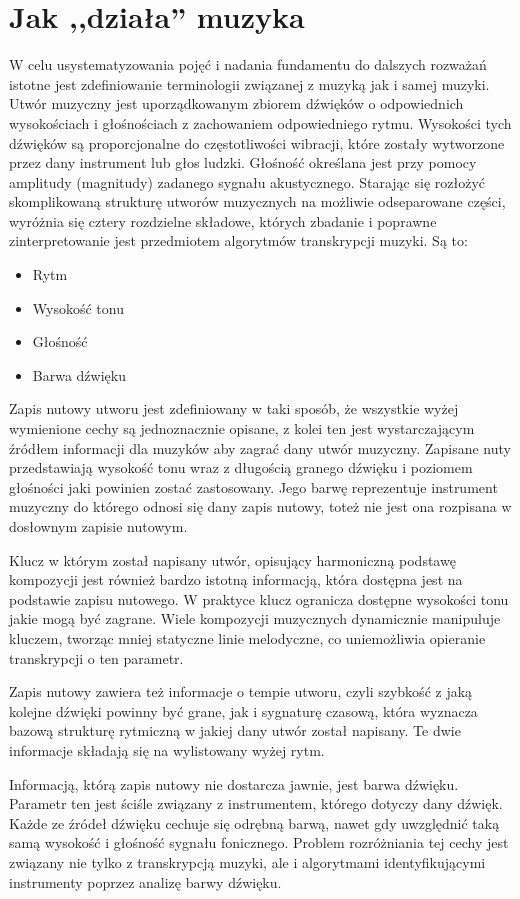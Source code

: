 \documentclass[12pt,a4paper,twoside]{mwart}
\begin{document}
\section{Jak ,,działa'' muzyka}\label{sec:JakDzialaMuzyka}
W celu usystematyzowania pojęć i nadania fundamentu do dalszych rozważań istotne jest zdefiniowanie terminologii związanej z muzyką jak i samej muzyki. Utwór muzyczny jest uporządkowanym zbiorem dźwięków o odpowiednich wysokościach i głośnościach z zachowaniem odpowiedniego rytmu. Wysokości tych dźwięków są proporcjonalne do częstotliwości wibracji, które zostały wytworzone przez dany instrument lub głos ludzki. Głośność określana jest przy pomocy amplitudy (magnitudy) zadanego sygnału akustycznego. Starając się rozłożyć skomplikowaną strukturę utworów muzycznych na możliwie odseparowane części, wyróżnia się cztery rozdzielne składowe, których zbadanie i poprawne zinterpretowanie jest przedmiotem algorytmów transkrypcji muzyki. Są to:
\begin{itemize}
\item Rytm
\item Wysokość tonu
\item Głośność
\item Barwa dźwięku
\end{itemize}
Zapis nutowy utworu jest zdefiniowany w taki sposób, że wszystkie wyżej wymienione cechy są jednoznacznie opisane, z kolei ten jest wystarczającym źródłem informacji dla muzyków aby zagrać dany utwór muzyczny. Zapisane nuty przedstawiają wysokość tonu wraz z długością granego dźwięku i poziomem głośności jaki powinien zostać zastosowany. Jego barwę reprezentuje instrument muzyczny do którego odnosi się dany zapis nutowy, toteż nie jest ona rozpisana w dosłownym zapisie nutowym.

Klucz w którym został napisany utwór, opisujący harmoniczną podstawę kompozycji jest również bardzo istotną informacją, która dostępna jest na podstawie zapisu nutowego. W praktyce klucz ogranicza dostępne wysokości tonu jakie mogą być zagrane. Wiele kompozycji muzycznych dynamicznie manipuluje kluczem, tworząc mniej statyczne linie melodyczne, co uniemożliwia opieranie transkrypcji o ten parametr.

Zapis nutowy zawiera też informacje o tempie utworu, czyli szybkość z jaką kolejne dźwięki powinny być grane, jak i sygnaturę czasową, która wyznacza bazową strukturę rytmiczną w jakiej dany utwór został napisany. Te dwie informacje składają się na wylistowany wyżej rytm.

Informacją, którą zapis nutowy nie dostarcza jawnie, jest barwa dźwięku. Parametr ten jest ściśle związany z instrumentem, którego dotyczy dany dźwięk. Każde ze źródeł dźwięku cechuje się odrębną barwą, nawet gdy uwzględnić taką samą wysokość i głośność sygnału fonicznego. Problem rozróżniania tej cechy jest związany nie tylko z transkrypcją muzyki, ale i algorytmami identyfikującymi instrumenty poprzez analizę barwy dźwięku.
\end{document}
